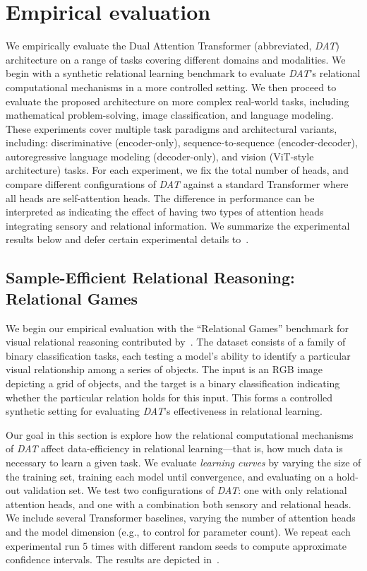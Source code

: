 \section{Empirical evaluation}\label{sec:experiments}

We empirically evaluate the Dual Attention Transformer (abbreviated, \textit{DAT}) architecture on a range of tasks covering different domains and modalities. We begin with a synthetic relational learning benchmark to evaluate \textit{DAT}'s relational computational mechanisms in a more controlled setting. We then proceed to evaluate the proposed architecture on more complex real-world tasks, including mathematical problem-solving, image classification, and language modeling. These experiments cover multiple task paradigms and architectural variants, including: discriminative (encoder-only), sequence-to-sequence (encoder-decoder), autoregressive language modeling (decoder-only), and vision (ViT-style architecture) tasks.
For each experiment, we fix the total number of heads, and compare different configurations of \textit{DAT} against a standard Transformer where all heads are self-attention heads. The difference in performance can be interpreted as indicating the effect of having two types of attention heads integrating sensory and relational information.
We summarize the experimental results below and defer certain experimental details to~.

\subsection{Sample-Efficient Relational Reasoning: Relational Games}\label{ssec:relgames}

We begin our empirical evaluation with the ``Relational Games'' benchmark for visual relational reasoning contributed by~\citet{shanahanExplicitlyRelationalNeurala}. The dataset consists of a family of binary classification tasks, each testing a model's ability to identify a particular visual relationship among a series of objects. The input is an RGB image depicting a grid of objects, and the target is a binary classification indicating whether the particular relation holds for this input. This forms a controlled synthetic setting for evaluating \textit{DAT}'s effectiveness in relational learning.

Our goal in this section is explore how the relational computational mechanisms of \textit{DAT} affect data-efficiency in relational learning---that is, how much data is necessary to learn a given task. We evaluate \textit{learning curves} by varying the size of the training set, training each model until convergence, and evaluating on a hold-out validation set. We test two configurations of \textit{DAT}: one with only relational attention heads, and one with a combination both sensory and relational heads. We include several Transformer baselines, varying the number of attention heads and the model dimension (e.g., to control for parameter count). We repeat each experimental run 5 times with different random seeds to compute approximate confidence intervals. The results are depicted in~.

